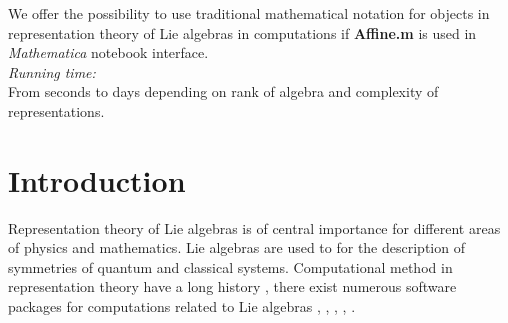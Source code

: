 \documentclass[preprint,12pt]{elsarticle}
\begin{document}
\begin{small}
We offer the possibility to use traditional mathematical notation for objects in representation theory of Lie algebras in computations if {\bf Affine.m} is used in {\it Mathematica} notebook interface. 
   \\
{\em Running time:}\\
From seconds to days depending on rank of algebra and complexity of representations.
   \\

\end{small}


\section{Introduction}
\label{intro}

Representation theory of Lie algebras is of central importance for different areas of physics and mathematics. Lie algebras are used to for the description of symmetries of quantum and classical systems. Computational method in representation theory have a long history \cite{belinfante1989survey}, there exist numerous software packages for computations related to Lie algebras \cite{simplie}, \cite{vanleeuwen1994lsp}, \cite{stembridge1995mps,coxweyl}, \cite{fischbacher2002ilp}, \cite{Fuchs:1996dd}. 
\end{document}
